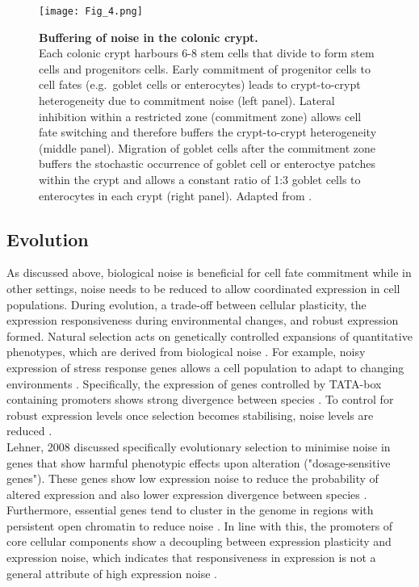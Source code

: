 \begin{figure}[!h]
\centering
\texttt{[image: Fig\_4.png]}
\caption[Buffering of noise in the colonic crypt]{\textbf{Buffering of noise in the colonic crypt.}\\
Each colonic crypt harbours 6-8 stem cells that divide to form stem cells and progenitors cells. 
Early commitment of progenitor cells to cell fates (e.g.~goblet cells or enterocytes) leads to crypt-to-crypt heterogeneity due to commitment noise (left panel). 
Lateral inhibition within a restricted zone (commitment zone) allows cell fate switching and therefore buffers the crypt-to-crypt heterogeneity (middle panel). 
Migration of goblet cells after the commitment zone buffers the stochastic occurrence of goblet cell or enteroctye patches within the crypt and allows a constant ratio of 1:3 goblet cells to enterocytes in each crypt (right panel). 
Adapted from \citep{Toth2017}.}
\label{fig0:noise_tissue}
\end{figure}

\subsection{Evolution}

As discussed above, biological noise is beneficial for cell fate commitment while in other settings, noise needs to be reduced to allow coordinated expression in cell populations. 
During evolution, a trade-off between cellular plasticity, the expression responsiveness during environmental changes, and robust expression formed. Natural selection acts on genetically controlled expansions of quantitative phenotypes, which are derived from biological noise \citep{Eldar2010}. 
For example, noisy expression of stress response genes allows a cell population to adapt to changing environments \citep{Lopez-Maury2009}. 
Specifically, the expression of genes controlled by TATA-box containing promoters shows strong divergence between species \citep{Tirosh2006}. 
To control for robust expression levels once selection becomes stabilising, noise levels are reduced \citep{Lopez-Maury2009, Eldar2010, Pires2016}. \\

Lehner, 2008 discussed specifically evolutionary selection to minimise noise in genes that show harmful phenotypic effects upon alteration ("dosage-sensitive genes"). 
These genes show low expression noise to reduce the probability of altered expression and also lower expression divergence between species \citep{Lehner2008}. 
Furthermore, essential genes tend to cluster in the genome in regions with persistent open chromatin to reduce noise \citep{Batada2007}. 
In line with this, the promoters of core cellular components show a decoupling between expression plasticity and expression noise, which indicates that responsiveness in expression is not a general attribute of high expression noise \citep{Lehner2010a}. \\

